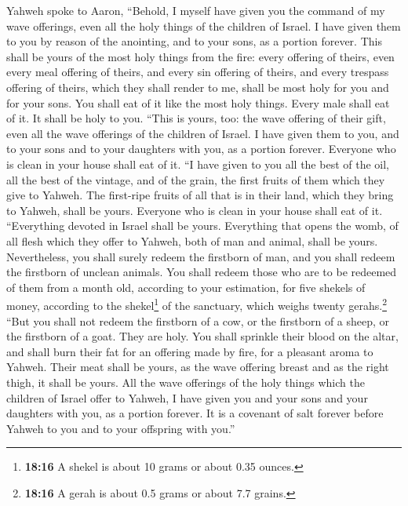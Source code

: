  Yahweh spoke to Aaron, ``Behold, I myself have given you
the command of my wave offerings, even all the holy things of the
children of Israel. I have given them to you by reason of the anointing,
and to your sons, as a portion forever.  This shall be
yours of the most holy things from the fire: every offering of theirs,
even every meal offering of theirs, and every sin offering of theirs,
and every trespass offering of theirs, which they shall render to me,
shall be most holy for you and for your sons.  You shall
eat of it like the most holy things. Every male shall eat of it. It
shall be holy to you.  ``This is yours, too: the wave
offering of their gift, even all the wave offerings of the children of
Israel. I have given them to you, and to your sons and to your daughters
with you, as a portion forever. Everyone who is clean in your house
shall eat of it.  ``I have given to you all the best of
the oil, all the best of the vintage, and of the grain, the first fruits
of them which they give to Yahweh.  The first-ripe fruits
of all that is in their land, which they bring to Yahweh, shall be
yours. Everyone who is clean in your house shall eat of it.
 ``Everything devoted in Israel shall be yours.
 Everything that opens the womb, of all flesh which they
offer to Yahweh, both of man and animal, shall be yours. Nevertheless,
you shall surely redeem the firstborn of man, and you shall redeem the
firstborn of unclean animals.  You shall redeem those who
are to be redeemed of them from a month old, according to your
estimation, for five shekels of money, according to the
shekel\footnote{\textbf{18:16} A shekel is about 10 grams or about 0.35
  ounces.} of the sanctuary, which weighs twenty gerahs.\footnote{\textbf{18:16}
  A gerah is about 0.5 grams or about 7.7 grains.}  ``But
you shall not redeem the firstborn of a cow, or the firstborn of a
sheep, or the firstborn of a goat. They are holy. You shall sprinkle
their blood on the altar, and shall burn their fat for an offering made
by fire, for a pleasant aroma to Yahweh.  Their meat
shall be yours, as the wave offering breast and as the right thigh, it
shall be yours.  All the wave offerings of the holy
things which the children of Israel offer to Yahweh, I have given you
and your sons and your daughters with you, as a portion forever. It is a
covenant of salt forever before Yahweh to you and to your offspring with
you.''

